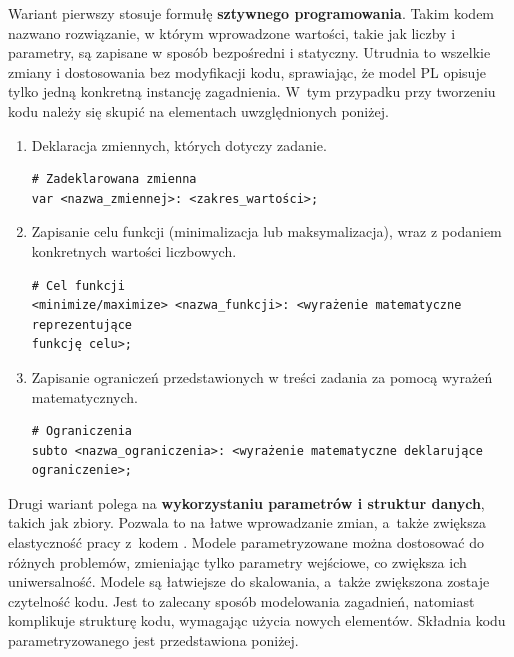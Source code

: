 Wariant pierwszy stosuje formułę \textbf{sztywnego programowania}. Takim kodem nazwano rozwiązanie, w którym wprowadzone wartości, takie jak liczby i parametry, są zapisane w sposób bezpośredni i statyczny. Utrudnia to wszelkie zmiany i dostosowania bez modyfikacji kodu, sprawiając, że model PL opisuje tylko jedną konkretną instancję zagadnienia. W~tym przypadku przy tworzeniu kodu   należy się skupić na elementach uwzględnionych poniżej.

\begin{enumerate}
\item Deklaracja zmiennych, których dotyczy zadanie.

\begin{lstlisting}[language=zimpl]
# Zadeklarowana zmienna
var <nazwa_zmiennej>: <zakres_wartości>;
\end{lstlisting}

\item Zapisanie celu funkcji (minimalizacja lub maksymalizacja), wraz z podaniem konkretnych wartości liczbowych.

\begin{lstlisting}[language=zimpl]
# Cel funkcji
<minimize/maximize> <nazwa_funkcji>: <wyrażenie matematyczne reprezentujące
funkcję celu>;
\end{lstlisting}

\item Zapisanie ograniczeń przedstawionych w treści zadania za pomocą wyrażeń matematycznych.

\begin{lstlisting}[language=zimpl]
# Ograniczenia
subto <nazwa_ograniczenia>: <wyrażenie matematyczne deklarujące ograniczenie>;
\end{lstlisting}
\end{enumerate}

Drugi wariant polega na \textbf{wykorzystaniu parametrów i struktur danych}, takich jak zbiory. Pozwala to na łatwe wprowadzanie zmian, a~także zwiększa elastyczność pracy z~kodem . Modele parametryzowane można dostosować do różnych problemów, zmieniając tylko parametry wejściowe, co zwiększa ich uniwersalność. Modele są łatwiejsze do skalowania, a~także zwiększona zostaje czytelność kodu. Jest to zalecany sposób modelowania zagadnień, natomiast komplikuje strukturę kodu, wymagając użycia nowych elementów. Składnia kodu parametryzowanego jest przedstawiona poniżej.

